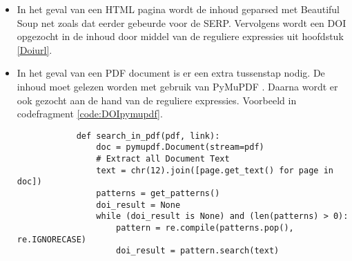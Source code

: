 \begin{itemize}
    \item In het geval van een HTML pagina wordt de inhoud geparsed met Beautiful Soup net zoals dat eerder gebeurde voor de SERP. Vervolgens wordt een DOI opgezocht in de inhoud door middel van de reguliere expressies uit hoofdstuk \ref{Doiurl}.
    \item In het geval van een PDF document is er een extra tussenstap nodig. De inhoud moet gelezen worden met gebruik van PyMuPDF \autocite{Pymupdf2025}. Daarna wordt er ook gezocht aan de hand van de reguliere expressies. Voorbeeld in codefragment \ref{code:DOIpymupdf}.
    \begin{listing}
        \begin{verbatim}
            def search_in_pdf(pdf, link):
                doc = pymupdf.Document(stream=pdf)
                # Extract all Document Text
                text = chr(12).join([page.get_text() for page in doc])
                patterns = get_patterns()
                doi_result = None
                while (doi_result is None) and (len(patterns) > 0):
                    pattern = re.compile(patterns.pop(), re.IGNORECASE)
                    doi_result = pattern.search(text)
            

\end{verbatim}
\end{listing}
\end{itemize}
